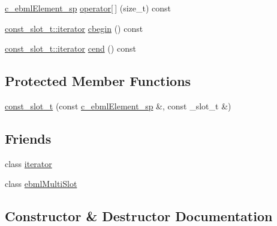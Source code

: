 \begin{DoxyCompactItemize}
\item 
\mbox{\hyperlink{namespaceebml_a2deef4e8071531b32e3533f1bf978917}{c\+\_\+ebml\+Element\+\_\+sp}} \mbox{\hyperlink{classebml_1_1const__slot__t_a4706154c749a53f737edb8aa4ff121bd}{operator\mbox{[}$\,$\mbox{]}}} (size\+\_\+t) const
\item 
\mbox{\hyperlink{classebml_1_1const__slot__t_1_1iterator}{const\+\_\+slot\+\_\+t\+::iterator}} \mbox{\hyperlink{classebml_1_1const__slot__t_a4df223f9aa7b04b651f1d54d1dcee39f}{cbegin}} () const
\item 
\mbox{\hyperlink{classebml_1_1const__slot__t_1_1iterator}{const\+\_\+slot\+\_\+t\+::iterator}} \mbox{\hyperlink{classebml_1_1const__slot__t_a97f42d33f7b13bb0313151d636e799a4}{cend}} () const
\end{DoxyCompactItemize}
\subsection*{Protected Member Functions}
\begin{DoxyCompactItemize}
\item 
\mbox{\hyperlink{classebml_1_1const__slot__t_aa4fa0ed56911fbf273e1ad08ad7b61f5}{const\+\_\+slot\+\_\+t}} (const \mbox{\hyperlink{namespaceebml_a2deef4e8071531b32e3533f1bf978917}{c\+\_\+ebml\+Element\+\_\+sp}} \&, const \+\_\+slot\+\_\+t \&)
\end{DoxyCompactItemize}
\subsection*{Friends}
\begin{DoxyCompactItemize}
\item 
class \mbox{\hyperlink{classebml_1_1const__slot__t_a67171474c4da6cc8efe0c7fafefd2b2d}{iterator}}
\item 
class \mbox{\hyperlink{classebml_1_1const__slot__t_ab14eb6c5a125d7276a7b4b5b6573428b}{ebml\+Multi\+Slot}}
\end{DoxyCompactItemize}


\subsection{Constructor \& Destructor Documentation}
\mbox{\label{classebml_1_1const__slot__t_aa4fa0ed56911fbf273e1ad08ad7b61f5}} 
